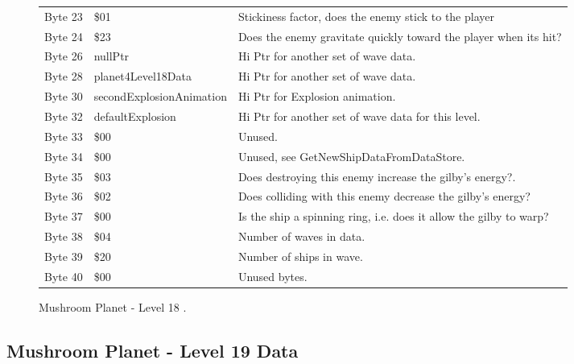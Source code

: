 \begin{figure}[H]
{\begin{adjustbox}{width=12cm}
\begin{tabular}{lll}
 Byte 23 & \$01                      & Stickiness factor, does the enemy stick to the player              \\
 Byte 24 & \$23                      & Does the enemy gravitate quickly toward the player when its hit?   \\
 Byte 26 & nullPtr                  & Hi Ptr for another set of wave data.                               \\
 Byte 28 & planet4Level18Data       & Hi Ptr for another set of wave data.                               \\
 Byte 30 & secondExplosionAnimation & Hi Ptr for Explosion animation.                                    \\
 Byte 32 & defaultExplosion         & Hi Ptr for another set of wave data for this level.                \\
 Byte 33 & \$00                      & Unused.                                                            \\
 Byte 34 & \$00                      & Unused, see GetNewShipDataFromDataStore.                           \\
 Byte 35 & \$03                      & Does destroying this enemy increase the gilby's energy?.           \\
 Byte 36 & \$02                      & Does colliding with this enemy decrease the gilby's energy?        \\
 Byte 37 & \$00                      & Is the ship a spinning ring, i.e. does it allow the gilby to warp? \\
 Byte 38 & \$04                      & Number of waves in data.                                           \\
 Byte 39 & \$20                      & Number of ships in wave.                                           \\
 Byte 40 & \$00                      & Unused bytes.                                                      \\
\bottomrule
\end{tabular}

  \end{adjustbox}

  }\caption*{Mushroom Planet - Level 18
.}
\end{figure}

\clearpage
\subsection{Mushroom Planet - Level 19 Data}

